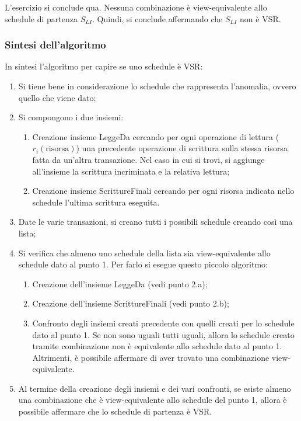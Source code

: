 \documentclass[a4paper]{article}
\begin{document}
	L'esercizio si conclude qua. Nessuna combinazione è view-equivalente allo schedule di partenza $S_{LI}$. Quindi, si conclude affermando che $S_{LI}$ non è VSR.\newpage
	
	\subsubsection{Sintesi dell'algoritmo}
	
	In sintesi l'algoritmo per capire se uno schedule è VSR:
	\begin{enumerate}
		\item Si tiene bene in considerazione lo schedule che rappresenta l'anomalia, ovvero quello che viene dato;
		
		\item Si compongono i due insiemi:
		\begin{enumerate}
			\item Creazione insieme LeggeDa cercando per ogni operazione di lettura ($r_{i}\left(\text{risorsa}\right)$) una precedente operazione di scrittura sulla stessa risorsa fatta da un'altra transazione. Nel caso in cui si trovi, si aggiunge all'insieme la scrittura incriminata e la relativa lettura;
			
			\item Creazione insieme ScrittureFinali cercando per ogni risorsa indicata nello schedule l'ultima scrittura eseguita.
		\end{enumerate}
		
		\item Date le varie transazioni, si creano tutti i possibili schedule creando così una lista;
		
		\item Si verifica che almeno uno schedule della lista sia view-equivalente allo schedule dato al punto 1. Per farlo si esegue questo piccolo algoritmo:
		\begin{enumerate}
			\item Creazione dell'insieme LeggeDa (vedi punto 2.a);
			
			\item Creazione dell'insieme ScrittureFinali (vedi punto 2.b);
			
			\item Confronto degli insiemi creati precedente con quelli creati per lo schedule dato al punto 1. Se non sono uguali tutti uguali, allora lo schedule creato tramite combinazione non è equivalente allo schedule dato al punto 1. Altrimenti, è possibile affermare di aver trovato una combinazione view-equivalente.
		\end{enumerate}
		
		\item Al termine della creazione degli insiemi e dei vari confronti, se esiste almeno una combinazione che è view-equivalente allo schedule del punto 1, allora è possibile affermare che lo schedule di partenza è VSR.
	\end{enumerate}\newpage
	
\end{document}
